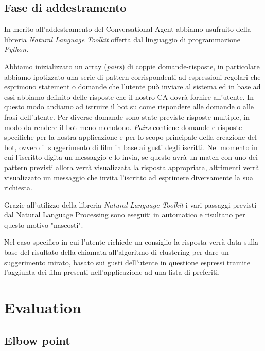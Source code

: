 \documentclass[a4paper, 10pt]{report}
\begin{document}
    \section{Fase di addestramento}\label{sec:fase-di-addestramento}

    In merito all'addestramento del Conversational Agent abbiamo usufruito della libreria \textit{Natural Language Toolkit}
    offerta dal linguaggio di programmazione \textit{Python}.

    Abbiamo inizializzato un array (\textit{pairs}) di coppie domande-risposte, in particolare abbiamo ipotizzato una serie di pattern
    corrispondenti ad espressioni regolari che esprimono statement o domande che l'utente può inviare al sistema ed
    in base ad essi abbiamo definito delle risposte che il nostro CA dovrà fornire all'utente. In questo modo andiamo ad istruire il bot
    su come rispondere alle domande o alle frasi dell'utente. Per diverse domande sono state previste risposte multiple, in modo da rendere il bot meno monotono.
    \textit{Pairs} contiene domande e risposte specifiche per la nostra applicazione e per lo scopo
    principale della creazione del bot, ovvero il suggerimento di film in base ai gusti degli iscritti.
    Nel momento in cui l'iscritto digita un messaggio e lo invia, se questo avrà un match con uno dei pattern previsti allora
    verrà visualizzata la risposta appropriata, altrimenti verrà visualizzato un messaggio che invita l'iscritto
    ad esprimere diversamente la sua richiesta.

    Grazie all'utilizzo della libreria \textit{Natural Language Toolkit} i vari passaggi previsti dal Natural Language Processing
    sono eseguiti in automatico e risultano per questo motivo "nascosti".

    Nel caso specifico in cui l'utente richiede un consiglio la risposta verrà data sulla base del risultato della chiamata
    all'algoritmo di clustering per dare un suggerimento mirato, basato sui gusti dell'utente in questione espressi tramite
    l'aggiunta dei film presenti nell'applicazione ad una lista di preferiti.



    \chapter{Evaluation}\label{ch:evaluation}


    \section{Elbow point}\label{sec:elbow-point}
\end{document}
